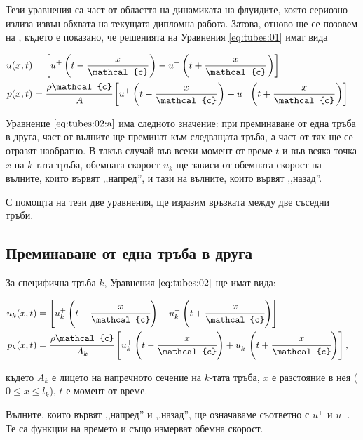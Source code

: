 \documentclass[main.tex]{subfiles}
\begin{document}
Тези уравнения са част от областта на динамиката на флуидите, която сериозно излиза извън обхвата на текущата дипломна работа. Затова, отново ще се позовем на \cite{rabiner_schafer78}, където е показано, че решенията на Уравнения \ref{eq:tubes:01} имат вида

\begin{subequations}
    \label{eq:tubes:02}
    \begin{flalign}
        \label{eq:tubes:02:a} u(x, t) & = \Q{u^+\B{t - \frac{x}{\mathcal{c}}} - u^-\B{t + \frac{x}{\mathcal{c}}}} && \\
        p(x, t) & = \cfrac{\rho \mathcal{c}}{A}\Q{u^+\B{t - \frac{x}{\mathcal{c}}} + u^-\B{t + \frac{x}{\mathcal{c}}}} &&
    \end{flalign}
\end{subequations}

Уравнение $\eqref{eq:tubes:02:a}$ има следното значение: при преминаване от една тръба в друга, част от вълните ще преминат към следващата тръба, а част от тях ще се отразят наобратно.
В такъв случай във всеки момент от време $t$ и във всяка точка $x$ на $k$-тата тръба, обемната скорост $u_k$ ще зависи от обемната скорост на вълните, които вървят ,,напред'', и тази на вълните, които вървят ,,назад''.

С помощта на тези две уравнения, ще изразим връзката между две съседни тръби.

\subsection{Преминаване от една тръба в друга}
За специфична тръба $k$, Уравнения $\eqref{eq:tubes:02}$ ще имат вида:

\begin{subequations}
    \label{eq:tubes:03}
    \begin{flalign}
        \label{eq:tubes:03:a} u_{k}(x, t) &= \Q{u_{k}^{+}\B{t - \cfrac{x}{\mathcal{c}}} - u_{k}^{-}\B{t + \cfrac{x}{\mathcal{c}}}} && \\
        p_{k}(x, t) &= \cfrac{\rho \mathcal{c}}{A_{k}} \Q{u_{k}^{+}\B{t - \cfrac{x}{\mathcal{c}}} + u_{k}^{-}\B{t + \cfrac{x}{\mathcal{c}}}},&&
    \end{flalign}
\end{subequations}

където $A_k$ е лицето на напречното сечение на $k$-тата тръба, $x$ е разстояние в нея ($0\leq x \leq l_k$), $t$ е момент от време.

Вълните, които вървят ,,напред'' и ,,назад'', ще означаваме съответно с $u^{+}$ и $u^{-}$. Те са функции на времето и също измерват обемна скорост.
\end{document}
